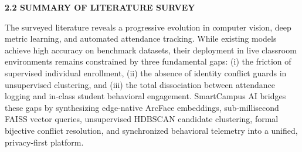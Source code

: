 \vspace{0.2in}
\begin{flushleft}
{\fontsize{14pt}{18pt}\selectfont \textbf{2.2 SUMMARY OF LITERATURE SURVEY}}\\[2mm]
\end{flushleft}

\noindent The surveyed literature reveals a progressive evolution in computer vision, deep metric learning, and automated attendance tracking. While existing models achieve high accuracy on benchmark datasets, their deployment in live classroom environments remains constrained by three fundamental gaps: (i) the friction of supervised individual enrollment, (ii) the absence of identity conflict guards in unsupervised clustering, and (iii) the total dissociation between attendance logging and in-class student behavioral engagement. SmartCampus AI bridges these gaps by synthesizing edge-native ArcFace embeddings, sub-millisecond FAISS vector queries, unsupervised HDBSCAN candidate clustering, formal bijective conflict resolution, and synchronized behavioral telemetry into a unified, privacy-first platform.
\newpage
